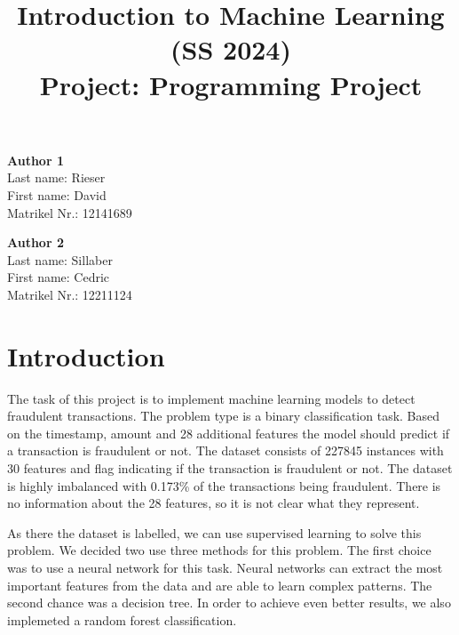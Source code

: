 \documentclass[a4paper, 10pt, conference]{ieeeconf}      %
\title{\LARGE \bf
Introduction to Machine Learning (SS 2024)\\ Project: Programming Project
\vspace{-3em}
}
\begin{document}
\maketitle
\vspace{-3em}
\thispagestyle{empty}
\pagestyle{empty}

\begin{strip}
\begin{tcolorbox}[
size=tight,
colback=white,
boxrule=0.2mm,
left=3mm,right=3mm, top=3mm, bottom=1mm
]
{\begin{multicols}{2}%

\textbf{Author 1}\\
Last name: Rieser\\
First name: David\\
Matrikel Nr.: 12141689\\

\columnbreak

\textbf{Author 2}\\
Last name: Sillaber\\
First name: Cedric\\ 
Matrikel Nr.: 12211124\\ 

\columnbreak

\end{multicols}}
\end{tcolorbox}
\end{strip}


\section{Introduction}
\label{sec:intro}
The task of this project is to implement machine learning models to detect fraudulent transactions. 
The problem type is a binary classification task. Based on the timestamp, amount and 28 additional features the model should predict if a transaction is fraudulent or not. 
The dataset consists of 227845 instances with 30 features and flag indicating if the transaction is fraudulent or not. The dataset is highly imbalanced with 0.173\% of the transactions being fraudulent. There is no information about the 28 features, so it is not clear what they represent. 

As there the dataset is labelled, we can use supervised learning to solve this problem. We decided two use three methods for this problem. 
The first choice was to use a neural network for this task. Neural networks can extract the most important features from the data and are able to learn complex patterns. 
The second chance was a decision tree. In order to achieve even better results, we also implemeted a random forest classification.
\end{document}
